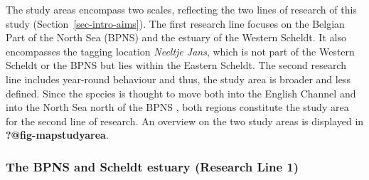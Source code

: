 \documentclass[
  authoryear,
  review,
  3p]{elsarticle}
\begin{document}
The study areas encompass two scales, reflecting the two lines of
research of this study (Section~\ref{sec-intro-aims}). The first
research line focuses on the Belgian Part of the North Sea (BPNS) and
the estuary of the Western Scheldt. It also encompasses the tagging
location \emph{Neeltje Jans}, which is not part of the Western Scheldt
or the BPNS but lies within the Eastern Scheldt. The second research
line includes year-round behaviour and thus, the study area is broader
and less defined. Since the species is thought to move both into the
English Channel and into the North Sea north of the BPNS
\citep{breve_2016, griffiths_2020}, both regions constitute the study
area for the second line of research. An overview on the two study areas
is displayed in \textbf{?@fig-mapstudyarea}.

\hypertarget{sec-mmscheldtBPNS}{%
\subsubsection{The BPNS and Scheldt estuary (Research Line
1)}\label{sec-mmscheldtBPNS}}
\end{document}

